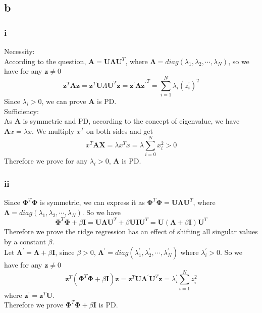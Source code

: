 \documentclass{article}
\begin{document}
\subsection*{b}
\subsubsection*{i}
Necessity: \\
According to the question, $\mathbf{A} = \mathbf{U} \mathbf{\Lambda} \mathbf{U}^T$, where $\mathbf{\Lambda} = diag(\lambda_1, \lambda_2, \cdots, \lambda_N)$, so we have for any $\mathbf{z} \neq 0$
$$\mathbf{z}^T \mathbf{A} \mathbf{z} = \mathbf{z}^T \mathbf{U} \Lambda \mathbf{U}^T \mathbf{z} = \mathbf{z^\prime} \mathbf{\Lambda} \mathbf{z^\prime}^T = \sum_{i=1}^{N} \lambda_i (z_{i}^{\prime})^2$$
Since $\lambda_i > 0$, we can prove $\mathbf{A}$ is PD. \\
Sufficiency: \\
As $\mathbf{A}$ is symmetric and PD, according to the concept of eigenvalue, we have $\mathbf{A}x = \lambda x$. We multiply $x^T$ on both sides and get
$$x^T\mathbf{AX} = \lambda x^T x = \lambda \sum_{i = 0}^{N} x_i^2 > 0$$
Therefore we prove for any $\lambda_i > 0$, $\mathbf{A}$ is PD.

\subsubsection*{ii}
Since $\mathbf{\Phi}^T\mathbf{\Phi}$ is symmetric, we can express it as $\mathbf{\Phi}^T\mathbf{\Phi} = \mathbf{U}\mathbf{\Lambda}\mathbf{U}^T$, where $\mathbf{\Lambda} = diag(\lambda_1, \lambda_2, \cdots, \lambda_N)$. So we have
$$\mathbf{\Phi}^T\mathbf{\Phi} + \beta\mathbf{I} = \mathbf{U}\mathbf{\Lambda}\mathbf{U}^T + \beta\mathbf{U}\mathbf{I}\mathbf{U}^T = \mathbf{U}(\mathbf{\Lambda}+\beta\mathbf{I}) \mathbf{U}^T$$
Therefore we prove the ridge regression has an effect of shifting all singular values by a constant $\beta$. \\
Let $\mathbf{\Lambda^{\prime}} = \mathbf{\Lambda} + \beta\mathbf{I}$, since $\beta > 0$, $\mathbf{\Lambda^{\prime}} = diag(\lambda_1^{\prime}, \lambda_2^{\prime}, \cdots, \lambda_N^{\prime})$ where $\lambda_i^{\prime} > 0$. So we have for any $\mathbf{z} \neq 0$
$$\mathbf{z}^T(\mathbf{\Phi}^T\mathbf{\Phi} + \beta\mathbf{I}) \mathbf{z} = \mathbf{z}^T \mathbf{U}\mathbf{\Lambda^{\prime}}\mathbf{U}^T \mathbf{z} = \lambda_i^\prime \sum_{i=1}^{N} z_i^2$$
where $\mathbf{z^\prime} = \mathbf{z}^T\mathbf{U}$. \\
Therefore we prove $\mathbf{\Phi}^T\mathbf{\Phi} + \beta\mathbf{I}$ is PD.
 
\end{document}
